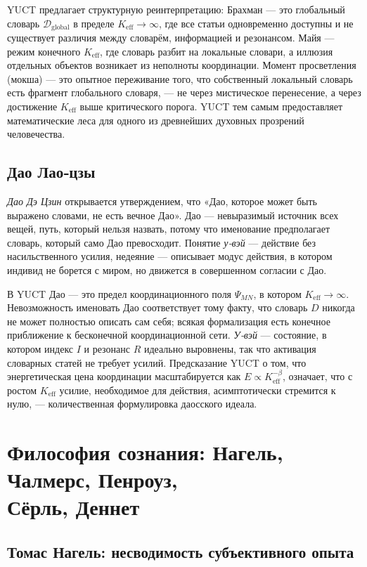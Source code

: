 \documentclass[12pt,a4paper]{article}
\begin{document}
	YUCT предлагает структурную реинтерпретацию: Брахман — это глобальный словарь \(\mathcal{D}_{\text{global}}\) в пределе \(K_{\mathrm{eff}} \to \infty\), где все статьи одновременно доступны и не существует различия между словарём, информацией и резонансом. Майя — режим конечного \(K_{\mathrm{eff}}\), где словарь разбит на локальные словари, а иллюзия отдельных объектов возникает из неполноты координации. Момент просветления (мокша) — это опытное переживание того, что собственный локальный словарь есть фрагмент глобального словаря, — не через мистическое перенесение, а через достижение \(K_{\mathrm{eff}}\) выше критического порога. YUCT тем самым предоставляет математические леса для одного из древнейших духовных прозрений человечества.
	
	\subsection{Дао Лао‑цзы}
	
	\emph{Дао Дэ Цзин} открывается утверждением, что «Дао, которое может быть выражено словами, не есть вечное Дао». Дао — невыразимый источник всех вещей, путь, который нельзя назвать, потому что именование предполагает словарь, который само Дао превосходит. Понятие \emph{у‑вэй} — действие без насильственного усилия, недеяние — описывает модус действия, в котором индивид не борется с миром, но движется в совершенном согласии с Дао.
	
	В YUCT Дао — это предел координационного поля \(\Psi_{MN}\), в котором \(K_{\mathrm{eff}} \to \infty\). Невозможность именовать Дао соответствует тому факту, что словарь \(D\) никогда не может полностью описать сам себя; всякая формализация есть конечное приближение к бесконечной координационной сети. \emph{У‑вэй} — состояние, в котором индекс \(I\) и резонанс \(R\) идеально выровнены, так что активация словарных статей не требует усилий. Предсказание YUCT о том, что энергетическая цена координации масштабируется как \(E \propto K_{\mathrm{eff}}^{-\beta}\), означает, что с ростом \(K_{\mathrm{eff}}\) усилие, необходимое для действия, асимптотически стремится к нулю, — количественная формулировка даосского идеала.
	
	\section{Философия сознания: Нагель, Чалмерс, Пенроуз, \\ Сёрль, Деннет}
	
	\subsection{Томас Нагель: несводимость субъективного опыта}
	
\end{document}
